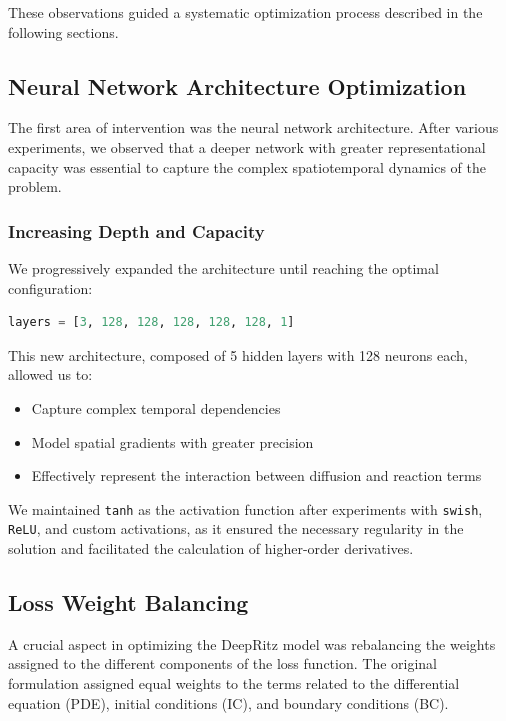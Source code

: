 These observations guided a systematic optimization process described in the following sections.

\subsection{Neural Network Architecture Optimization}

The first area of intervention was the neural network architecture. After various experiments, we observed that a deeper network with greater representational capacity was essential to capture the complex spatiotemporal dynamics of the problem.

\subsubsection{Increasing Depth and Capacity}

We progressively expanded the architecture until reaching the optimal configuration:
\begin{lstlisting}[language=Python]
layers = [3, 128, 128, 128, 128, 128, 1]
\end{lstlisting}

This new architecture, composed of 5 hidden layers with 128 neurons each, allowed us to:
\begin{itemize}
    \item Capture complex temporal dependencies
    \item Model spatial gradients with greater precision
    \item Effectively represent the interaction between diffusion and reaction terms
\end{itemize}

We maintained \texttt{tanh} as the activation function after experiments with \texttt{swish}, \texttt{ReLU}, and custom activations, as it ensured the necessary regularity in the solution and facilitated the calculation of higher-order derivatives.

\subsection{Loss Weight Balancing}

A crucial aspect in optimizing the DeepRitz model was rebalancing the weights assigned to the different components of the loss function. The original formulation assigned equal weights to the terms related to the differential equation (PDE), initial conditions (IC), and boundary conditions (BC).

